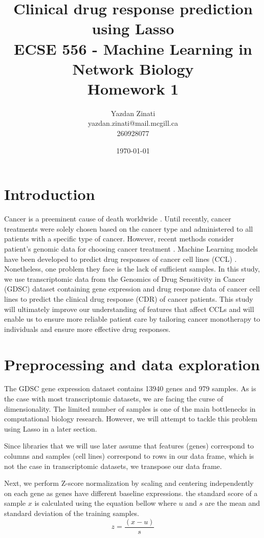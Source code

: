 \documentclass[12pt, letterpaper]{article}
\title{Clinical drug response prediction using Lasso\\ \large{ECSE 556 - Machine Learning in Network Biology} \\ \large{Homework 1}}
\author{Yazdan Zinati\\yazdan.zinati@mail.mcgill.ca\\ 260928077}
\date{\today}
\begin{document}
 \maketitle
 \newpage
 \section*{Introduction}
 Cancer is a preeminent cause of death worldwide \cite{bray2018global}. Until recently, cancer treatments were solely chosen based on the cancer type and administered to all patients with a specific type of cancer. However, recent methods consider patient's genomic data for choosing cancer treatment \cite{twomey2017drug}. Machine Learning models have been developed to predict drug responses of cancer cell lines (CCL) \cite{10.1093/bib/bbw065}. Nonetheless, one problem they face is the lack of sufficient samples. 
 In this study, we use transcriptomic data from the Genomics of Drug Sensitivity in Cancer (GDSC) dataset containing gene expression and drug response data of cancer cell lines to predict the clinical drug response (CDR) of cancer patients. This study will ultimately improve our understanding of features that affect CCLs and will enable us to ensure more reliable patient care by tailoring cancer monotherapy to individuals and ensure more effective drug responses.  
 
 \section*{Preprocessing and data exploration}

The GDSC gene expression dataset contains 13940 genes and 979 samples. As is the case with most transcriptomic datasets, we are facing the curse of dimensionality. The limited number of samples is one of the main bottlenecks in computational biology research. However, we will attempt to tackle this problem using Lasso in a later section. 

Since libraries that we will use later assume that features (genes) correspond to columns and samples (cell lines) correspond to rows in our data frame, which is not the case in transcriptomic datasets, we transpose our data frame. 

 Next, we perform Z-score normalization by scaling and centering independently on each gene as genes have different baseline expressions. the standard score of a sample $x$ is calculated using the equation bellow where $u$ and $s$ are the mean and standard deviation of the training samples. 
$$z = \frac{(x - u)}{s}$$
\end{document}
